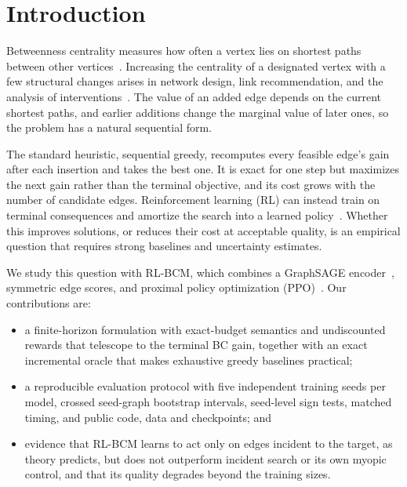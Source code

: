 \documentclass[runningheads]{llncs}
\newcommand{\rlbcm}{RL-BCM}
\begin{document}
\section{Introduction}
Betweenness centrality measures how often a vertex lies on shortest paths
between other vertices~\cite{Freeman1977}. Increasing the centrality of a
designated vertex with a few structural changes arises in network design,
link recommendation, and the analysis of interventions~\cite{Ishakian2012,Parotsidis2016,Bergamini2018}. The value of an added edge depends on the
current shortest paths, and earlier additions change the marginal value of
later ones, so the problem has a natural sequential form.

The standard heuristic, sequential greedy, recomputes every feasible edge's
gain after each insertion and takes the best one. It is exact for one step
but maximizes the next gain rather than the terminal objective, and its
cost grows with the number of candidate edges. Reinforcement learning (RL)
can instead train on terminal consequences and amortize the search into a
learned policy~\cite{Khalil2017,Darvariu2021}. Whether this improves
solutions, or reduces their cost at acceptable quality, is an empirical
question that requires strong baselines and uncertainty estimates.

We study this question with \rlbcm, which combines a GraphSAGE
encoder~\cite{Hamilton2017}, symmetric edge scores, and proximal policy
optimization (PPO)~\cite{Schulman2017}. Our contributions are:
\begin{itemize}
\item a finite-horizon formulation with exact-budget semantics and
undiscounted rewards that telescope to the terminal BC gain, together with
an exact incremental oracle that makes exhaustive greedy baselines
practical;
\item a reproducible evaluation protocol with five independent training
seeds per model, crossed seed-graph bootstrap intervals, seed-level sign
tests, matched timing, and public code, data and checkpoints; and
\item evidence that \rlbcm{} learns to act only on edges incident to the
target, as theory predicts, but does not outperform incident search or its
own myopic control, and that its quality degrades beyond the training
sizes.
\end{itemize}

\end{document}
